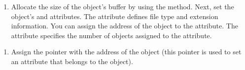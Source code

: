 \documentclass[letterpaper,12pt,english,openany,oneside]{sphinxmanual}
\begin{document}
\begin{sphinxVerbatim}[commandchars=\\\{\}]
  
\end{sphinxVerbatim}
\begin{enumerate}
%
\setcounter{enumi}{4}
\item {} 
Allocate the size of the  object’s buffer by using the  method. Next, set the  object’s  and  attributes. The  attribute defines file type and extension information. You can assign the address of the  object to the  attribute. The  attribute specifies the number of  objects assigned to the  attribute.

\end{enumerate}

\begin{sphinxVerbatim}[commandchars=\\\{\}]
   
   
   
\end{sphinxVerbatim}
\begin{enumerate}
%
\setcounter{enumi}{5}
\item {} 
Assign the  pointer with the address of the  object (this pointer is used to set an attribute that belongs to the  object).

\end{enumerate}
\end{document}
